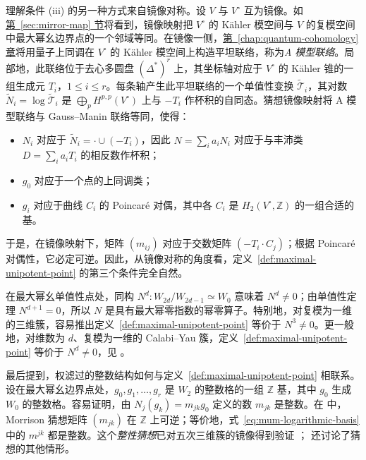 理解条件 (iii) 的另一种方式来自镜像对称。设 $V$ 与 $V^\circ$ 互为镜像。如\hyperref[sec:mirror-map]{第~\ref*{sec:mirror-map} 节}将看到，镜像映射把 $V^\circ$ 的 Kähler 模空间与 $V$ 的复模空间中最大幂幺边界点的一个邻域等同。在镜像一侧，\hyperref[chap:quantum-cohomology]{第~\ref*{chap:quantum-cohomology} 章}将用量子上同调在 $V^\circ$ 的 Kähler 模空间上构造平坦联络，称为\emph{A 模型联络}。局部地，此联络位于去心多圆盘 $(\Delta^*)^r$ 上，其坐标轴对应于 $V^\circ$ 的 Kähler 锥的一组生成元 $T_i$，$1\leq i\leq r$。每条轴产生此平坦联络的一个单值性变换 $\widetilde{\mathcal T}_i$，其对数 $\widetilde N_i=\log\widetilde{\mathcal T}_i$ 是 $\bigoplus_pH^{p,p}(V^\circ)$ 上与 $-T_i$ 作杯积的自同态。猜想镜像映射将 A 模型联络与 Gauss--Manin 联络等同，使得：
\begin{itemize}
\item $N_i$ 对应于 $\widetilde N_i=\mathord{\cdot}\cup(-T_i)$，因此 $N=\sum_i a_iN_i$ 对应于与丰沛类 $D=\sum_i a_iT_i$ 的相反数作杯积；
\item $g_0$ 对应于一个点的上同调类；
\item $g_i$ 对应于曲线 $C_i$ 的 Poincaré 对偶，其中各 $C_i$ 是 $H_2(V^\circ,\mathbb Z)$ 的一组合适的基。
\end{itemize}
于是，在镜像映射下，矩阵 $(m_{ij})$ 对应于交数矩阵 $(-T_i\cdot C_j)$；根据 Poincaré 对偶性，它必定可逆。因此，从镜像对称的角度看，定义~\ref{def:maximal-unipotent-point} 的第三个条件完全自然。

在最大幂幺单值性点处，同构 $N^d:W_{2d}/W_{2d-1}\simeq W_0$ 意味着 $N^d\ne0$；由单值性定理 $N^{d+1}=0$，所以 $N$ 是具有最大幂零指数的幂零算子。特别地，对复模为一维的三维簇，容易推出定义~\ref{def:maximal-unipotent-point} 等价于 $N^3\ne0$。更一般地，对维数为 $d$、复模为一维的 Calabi--Yau 簇，定义~\ref{def:maximal-unipotent-point} 等价于 $N^d\ne0$，见 。

最后提到，权滤过的整数结构如何与定义~\ref{def:maximal-unipotent-point} 相联系。设在最大幂幺边界点处，$g_0,g_1,\ldots,g_r$ 是 $W_2$ 的整数格的一组 $\mathbb Z$ 基，其中 $g_0$ 生成 $W_0$ 的整数格。容易证明，由 $N_j(g_k)=m_{jk}g_0$ 定义的数 $m_{jk}$ 是整数。在  中，Morrison 猜想矩阵 $(m_{jk})$ 在 $\mathbb Z$ 上可逆；等价地，式~\eqref{eq:mum-logarithmic-basis} 中的 $m^{jk}$ 都是整数。这个\emph{整性猜想}已对五次三维簇的镜像得到验证 ； 还讨论了猜想的其他情形。

